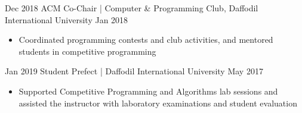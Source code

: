 %
%
%


\begin{experiences}

  \mentoring
    {Dec 2018}
    {ACM Co-Chair | Computer \& Programming Club, Daffodil International University}
    {Jan 2018}
    {
      \begin{itemize}
        \item Coordinated programming contests and club activities, and mentored students
              in competitive programming
      \end{itemize}
    }

  \emptySeparator

  \mentoring
  {Jan 2019}
  {Student Prefect | Daffodil International University}
  {May 2017}
  {
    \begin{itemize}
      \item Supported Competitive Programming and Algorithms lab sessions and assisted the
            instructor with laboratory examinations and student evaluation
    \end{itemize}
  }

\end{experiences}
